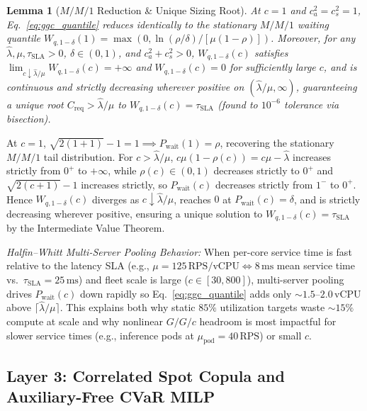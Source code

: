 \documentclass[journal]{IEEEtran}
\newtheorem{lemma}{Lemma}
\begin{document}
\begin{lemma}[$M/M/1$ Reduction \& Unique Sizing Root]\label{lem:ggc}
At $c=1$ and $c_a^2 = c_s^2 = 1$, Eq.~\eqref{eq:ggc_quantile} reduces identically to the stationary $M/M/1$ waiting quantile $W_{q,1-\delta}(1) = \max(0, \ln(\rho/\delta)/[\mu(1-\rho)])$. Moreover, for any $\hat{\lambda}, \mu, \tau_{\mathrm{SLA}} > 0$, $\delta \in (0,1)$, and $c_a^2 + c_s^2 > 0$, $W_{q,1-\delta}(c)$ satisfies $\lim_{c \downarrow \hat{\lambda}/\mu} W_{q,1-\delta}(c) = +\infty$ and $W_{q,1-\delta}(c) = 0$ for sufficiently large $c$, and is continuous and strictly decreasing wherever positive on $(\hat{\lambda}/\mu, \infty)$, guaranteeing a unique root $C_{\mathrm{req}} > \hat{\lambda}/\mu$ to $W_{q,1-\delta}(c) = \tau_{\mathrm{SLA}}$ (found to $10^{-6}$ tolerance via bisection).
\end{lemma}
\begin{IEEEproof}
At $c=1$, $\sqrt{2(1+1)}-1 = 1 \implies P_{\mathrm{wait}}(1) = \rho$, recovering the stationary $M/M/1$ tail distribution. For $c > \hat{\lambda}/\mu$, $c\mu(1-\rho(c)) = c\mu - \hat{\lambda}$ increases strictly from $0^+$ to $+\infty$, while $\rho(c) \in (0,1)$ decreases strictly to $0^+$ and $\sqrt{2(c+1)}-1$ increases strictly, so $P_{\mathrm{wait}}(c)$ decreases strictly from $1^-$ to $0^+$. Hence $W_{q,1-\delta}(c)$ diverges as $c \downarrow \hat{\lambda}/\mu$, reaches $0$ at $P_{\mathrm{wait}}(c) = \delta$, and is strictly decreasing wherever positive, ensuring a unique solution to $W_{q,1-\delta}(c) = \tau_{\mathrm{SLA}}$ by the Intermediate Value Theorem.
\end{IEEEproof}

\emph{Halfin--Whitt Multi-Server Pooling Behavior:} When per-core service time is fast relative to the latency SLA (e.g., $\mu = 125\,\text{RPS/vCPU} \iff 8\,\text{ms}$ mean service time vs.\ $\tau_{\mathrm{SLA}} = 25\,\text{ms}$) and fleet scale is large ($c \in [30, 800]$), multi-server pooling drives $P_{\mathrm{wait}}(c)$ down rapidly so Eq.~\eqref{eq:ggc_quantile} adds only $\sim 1.5$--$2.0\,\text{vCPU}$ above $\lceil \hat{\lambda}/\mu \rceil$. This explains both why static $85\%$ utilization targets waste $\sim 15\%$ compute at scale and why nonlinear $G/G/c$ headroom is most impactful for slower service times (e.g., inference pods at $\mu_{\mathrm{pod}} = 40\,\text{RPS}$) or small $c$.

\subsection{Layer 3: Correlated Spot Copula and Auxiliary-Free CVaR MILP}
\end{document}
